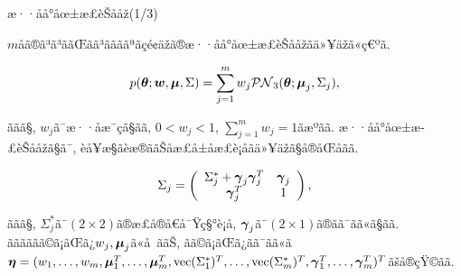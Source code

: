\documentclass[dvipdfmx]{beamer} %
\newcommand{\bm}[1]{\mbox{\boldmath $#1$}}
\begin{document}
\begin{frame}{æ··åå°åœ±æ­£èŠååž(1/3)}

$m$åã®ã³ã³ããŒãã³ããããªãçé¢äžã®æ··åå°åœ±æ­£èŠååžãä»¥äžã«ç€ºã. 

\vspace{-0.3cm}
\begin{eqnarray*}
\label{MPNS}
p(\bm \theta;\bm w,\bm \mu, \Sigma) = \sum^m_{j=1} w_j \mathcal{PN}_3(\bm \theta;\bm \mu_j, \Sigma_j),
\end{eqnarray*}

\noindent
ããã§, $w_j$ã¯æ··åæ¯çã§ãã, $0 < w_j < 1$, $\sum^m_{j=1} w_j = 1$ãæºãã. æ··åå°åœ±æ­£èŠååžã§ã¯, è­å¥æ§ãèæ®ããŠåæ£å±åæ£è¡åãä»¥äžã§å®åŒåãã. 

\vspace{-0.2cm}
\begin{eqnarray*}
\label{SIGMA}
 \Sigma_j = \left(
    \begin{array}{cc}
      \Sigma^*_j + \bm \gamma_j \bm \gamma_j^T & \bm \gamma_j \\
      \bm \gamma_j^T & 1
    \end{array}
  \right),
\end{eqnarray*}

\noindent
ããã§, $\Sigma^*_j$ã¯$(2 \times 2)$ã®æ­£å®å€å¯Ÿç§°è¡å, $\bm \gamma_j$ã¯$(2 \times 1)$ã®ãã¯ãã«ã§ãã. ãããããã©ã¡ãŒã¿$w_j, \bm \mu_j$ã«å ããŠ, ãã©ã¡ãŒã¿ãã¯ãã«ã$\bm \eta = (w_1, \dots, w_m, \bm \mu_1^T, \dots, \bm \mu_m^T, \mbox{vec}(\Sigma^*_1)^T, \dots, \mbox{vec}(\Sigma^*_m)^T, \bm \gamma_1^T, \dots, \bm \gamma_m^T)^T$ãšå®çŸ©ãã.

\end{frame}
\end{document}
